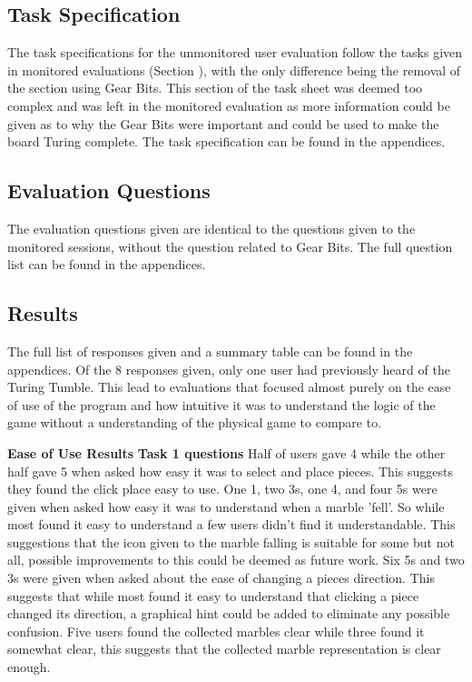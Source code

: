 \documentclass{l4proj}
\begin{document}
\subsection{Task Specification}
The task specifications for the unmonitored user evaluation follow the tasks given in monitored evaluations (Section ), with the only difference being the removal of the section using Gear Bits. This section of the task sheet was deemed too complex and was left in the monitored evaluation as more information could be given as to why the Gear Bits were important and could be used to make the board Turing complete. The task specification can be found in the appendices.

\subsection{Evaluation Questions}
The evaluation questions given are identical to the questions given to the monitored sessions, without the question related to Gear Bits. The full question list can be found in the appendices.   

\subsection{Results}
The full list of responses given and a summary table can be found in the appendices. Of the 8 responses given, only one user had previously heard of the Turing Tumble. This lead to evaluations that focused almost purely on the ease of use of the program and how intuitive it was to understand the logic of the game without a understanding of the physical game to compare to. 

\textbf{Ease of Use Results}
\textbf{Task 1 questions}
Half of users gave 4 while the other half gave 5 when asked how easy it was to select and place pieces. This suggests they found the click place easy to use. One 1, two 3s, one 4, and four 5s were given when asked how easy it was to understand when a marble 'fell'. So while most found it easy to understand a few users didn't find it understandable. This suggestions that the icon given to the marble falling is suitable for some but not all, possible improvements to this could be deemed as future work. Six 5s and two 3s were given when asked about the ease of changing a pieces direction. This suggests that while most found it easy to understand that clicking a piece changed its direction, a graphical hint could be added to eliminate any possible confusion. Five users found the collected marbles clear while three found it somewhat clear, this suggests that the collected marble representation is clear enough.
\end{document}
